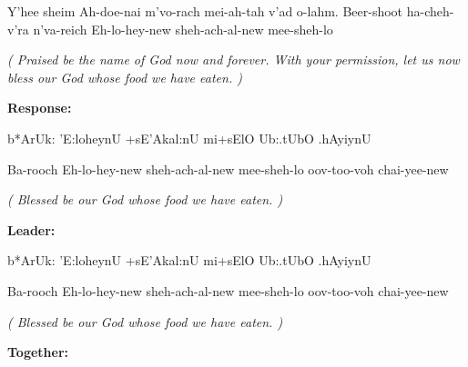 \documentclass[12pt]{article}
\newenvironment{hebrewPrayer}
    {\begin{cjhebrew}
     \Large
    }
    {
    \end{cjhebrew}
    }
\newenvironment{hebrewTransliteration}{}{\par}
\newenvironment{unreadHebrewTranslation}{\itshape(\hspace{-0.2em}}{\hspace{-0.2em})\par}
\newcommand{\god}{God}
\newcommand{\hebrewVowelOh}{\textrm{\hspace{0.2em}}o\textrm{\hspace{-0.2em}}}
\newcommand{\transliterateAdonai}{Ah-doe-nai}
\newcommand{\transliterateEloheinu}{Eh-lo-hey-new}
\begin{document}
\begin{hebrewTransliteration}
    Y'hee sheim {\transliterateAdonai} m'vo-rach mei-ah-tah v'ad o-lahm. Beer-shoot ha-cheh-v'ra n'va-reich {\transliterateEloheinu} sheh-ach-al-new mee-sheh-lo
\end{hebrewTransliteration}

\begin{unreadHebrewTranslation}
    Praised be the name of {\god} now and forever. With your permission, let us now bless our {\god} whose food we have eaten.
\end{unreadHebrewTranslation}


\textbf{Response:}

\begin{hebrewPrayer}
    b*ArUk: 'E:l{\hebrewVowelOh}heynU +sE'Akal:nU mi+sElO Ub:.tUbO .hAyiynU
\end{hebrewPrayer}

\begin{hebrewTransliteration}
    Ba-rooch {\transliterateEloheinu} sheh-ach-al-new mee-sheh-lo oov-too-voh chai-yee-new
\end{hebrewTransliteration}

\begin{unreadHebrewTranslation}
    Blessed be our {\god} whose food we have eaten.
\end{unreadHebrewTranslation}

\textbf{Leader:}

\begin{hebrewPrayer}
    b*ArUk: 'E:l{\hebrewVowelOh}heynU +sE'Akal:nU mi+sElO Ub:.tUbO .hAyiynU
\end{hebrewPrayer}

\begin{hebrewTransliteration}
    Ba-rooch {\transliterateEloheinu} sheh-ach-al-new mee-sheh-lo oov-too-voh chai-yee-new
\end{hebrewTransliteration}

\begin{unreadHebrewTranslation}
    Blessed be our {\god} whose food we have eaten.
\end{unreadHebrewTranslation}



\textbf{Together:}
\end{document}
